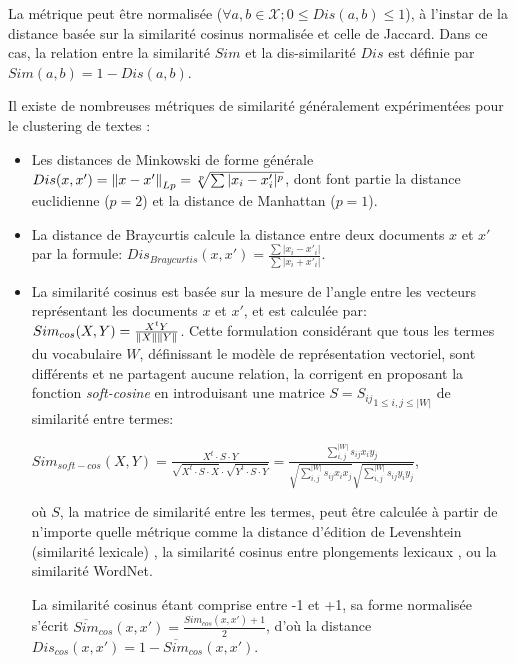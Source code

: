 La métrique peut être normalisée ($\forall a,b \in \mathcal{X};  0 \leq Dis(a,b) \leq 1$), à l'instar de la distance basée sur la similarité cosinus normalisée et celle de Jaccard. Dans ce cas, la relation entre la similarité $Sim$ et la dis-similarité $Dis$ est définie par $Sim(a,b) = 1 - Dis(a,b)$.

Il existe de nombreuses métriques de similarité généralement expérimentées pour le clustering de textes \citep{huang2008similarityTextClustering, vijaymeena2016surveySim, afzali2018SimKmeans}:
\begin{itemize}
	\item Les distances de Minkowski de forme générale $Dis(x,x') = \left\lVert x - x'\right\rVert_{Lp} = \sqrt[p]{\sum \vert x_i - x'_i \vert ^p}$, dont font partie la distance euclidienne ($p=2$) et la distance de Manhattan ($p=1$).
	\item La distance de Braycurtis calcule la distance entre deux documents $x$ et $x'$ par la formule: $Dis_{Braycurtis}(x,x') = \frac{\sum \vert x_i - x'_i \vert}{\sum \vert x_i + x'_i \vert}$.
	\item La similarité cosinus est basée sur la mesure de l'angle entre les vecteurs représentant les documents $x$ et $x'$, et est calculée par: $Sim_{cos}(X,Y) = \frac{X^tY}{\left\lVert X\right\rVert\left\lVert Y\right\rVert}$.
	Cette formulation considérant que tous les termes du vocabulaire $W$, définissant le modèle de représentation vectoriel, sont différents et ne partagent aucune relation, \citet{sidorov2014softcosine} la corrigent en proposant la fonction \textit{soft-cosine} en introduisant une matrice $S = {S_{ij}}_{1\leq i,j \leq \vert W \vert}$ de similarité entre  termes: 
	
	$Sim_{soft-cos}(X,Y)= \frac{X^t\cdot S\cdot Y}{\sqrt{X^t\cdot S\cdot X}\cdot \sqrt{Y^t\cdot S\cdot Y}} = \frac{\sum\limits_{i,j}^{\vert W \vert}s_{ij}x_iy_j}{\sqrt{\sum\limits_{i,j}^{\vert W \vert}s_{ij}x_ix_j}\sqrt{\sum\limits_{i,j}^{\vert W \vert}s_{ij}y_iy_j}}$,
	
	où $S$, la matrice de similarité entre les termes, peut être calculée à partir de n'importe quelle métrique comme la distance d'édition de Levenshtein (similarité lexicale) \citep{sidorov2014softcosine},  la similarité cosinus entre  plongements lexicaux \citep{charlet2017simbow_acl, charlet2017simbow_tal}, ou la similarité WordNet.
	
	La similarité cosinus  étant comprise entre -1 et +1, sa forme normalisée s'écrit  $\overline{Sim}_{cos}(x,x') = \frac{Sim_{cos}(x,x') + 1}{2}$, d'où la distance $Dis_{cos}(x,x') = 1 - \overline{Sim}_{cos}(x,x')$.
	

\end{itemize}
